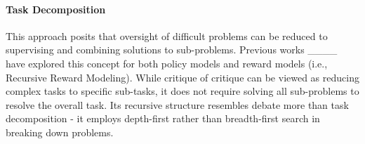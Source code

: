 \vspace{-3mm}

\paragraph{Task Decomposition} This approach posits that oversight of difficult problems can be reduced to supervising and combining solutions to sub-problems. Previous works ____ have explored this concept for both policy models and reward models (i.e., Recursive Reward Modeling). While critique of critique can be viewed as reducing complex tasks to specific sub-tasks, it does not require solving all sub-problems to resolve the overall task. Its recursive structure resembles debate more than task decomposition - it employs depth-first rather than breadth-first search in breaking down problems.